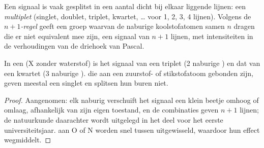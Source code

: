 \begin{definition}\label{def:g12:proton-nmr:multiplet}
Een signaal is vaak gesplitst in een aantal dicht bij elkaar liggende
lijnen: een \emph{multiplet}
(singlet, doublet, triplet, kwartet, \dots{} voor 1, 2, 3, 4 lijnen). Volgens de
\emph{$n+1$-regel} geeft een groep
 waarvan de naburige koolstofatomen samen $n$
 dragen die er niet equivalent mee zijn, een signaal van $n+1$
lijnen, met intensiteiten in de verhoudingen van de driehoek van
Pascal.
\end{definition}

\begin{proposition}\label{prop:g12:proton-nmr:n-plus-one}
In een   (X zonder waterstof) is het signaal van
 een triplet (2 naburige ) en dat van  een
kwartet (3 naburige ).  die aan een zuurstof- of
stikstofatoom gebonden zijn, geven meestal een singlet en splitsen hun
buren niet.
\end{proposition}

\begin{proof}
Aangenomen: elk naburig  verschuift het signaal een klein beetje
omhoog of omlaag, afhankelijk van zijn eigen toestand, en de combinaties
geven $n+1$ lijnen; de natuurkunde daarachter wordt uitgelegd in het
deel voor het eerste universiteitsjaar.  aan O of N worden snel
tussen  uitgewisseld, waardoor hun effect wegmiddelt.
\end{proof}

